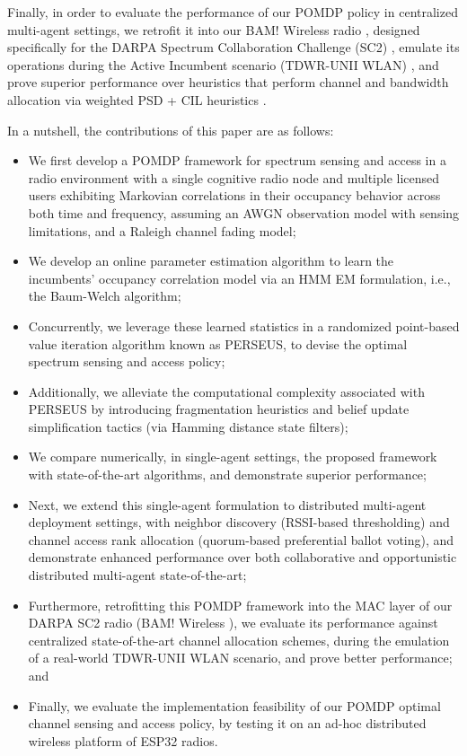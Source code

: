 \documentclass[12pt, draftcls, onecolumn]{IEEEtran}
\begin{document}
Finally, in order to evaluate the performance of our POMDP policy in centralized multi-agent settings, we retrofit it into our BAM! Wireless radio \cite{BAM}, designed specifically for the DARPA Spectrum Collaboration Challenge (SC2) \cite{DARPA:SC2, DARPA:SC2scenarios}, emulate its operations during the Active Incumbent scenario (TDWR-UNII WLAN) \cite{DARPA:ActiveIncumbent}, and prove superior performance over heuristics that perform channel and bandwidth allocation via weighted PSD + CIL heuristics \cite{DARPA:CIL, DARPASC2:end1, DARPASC2:end2, DARPASC2:end3, DARPASC2:end4}.

 In a nutshell, the contributions of this paper are as follows:
\begin{itemize}
    \item We first develop a POMDP framework for spectrum sensing and access in a radio environment with a single cognitive radio node and multiple licensed users exhibiting Markovian correlations in their occupancy behavior across both time and frequency, assuming an AWGN observation model with sensing limitations, and a Raleigh channel fading model;
    \item We develop an online parameter estimation algorithm to learn the incumbents' occupancy correlation model via an HMM EM formulation, i.e., the Baum-Welch algorithm;
    \item Concurrently, we leverage these learned statistics in a randomized point-based value iteration algorithm known as PERSEUS, to devise the optimal spectrum sensing and access policy;
    \item Additionally, we alleviate the computational complexity associated with PERSEUS by introducing fragmentation heuristics and belief update simplification tactics (via Hamming distance state filters);
    \item We compare numerically, in single-agent settings, the proposed framework with state-of-the-art algorithms, and demonstrate superior performance;
    \item Next, we extend this single-agent formulation to distributed multi-agent deployment settings, with neighbor discovery (RSSI-based thresholding) and channel access rank allocation (quorum-based preferential ballot voting), and demonstrate enhanced performance over both collaborative and opportunistic distributed multi-agent state-of-the-art;
    \item Furthermore, retrofitting this POMDP framework into the MAC layer of our DARPA SC2 radio (BAM! Wireless \cite{BAM}), we evaluate its performance against centralized state-of-the-art channel allocation schemes, during the emulation of a real-world TDWR-UNII WLAN scenario, and prove better performance; and
    \item Finally, we evaluate the implementation feasibility of our POMDP optimal channel sensing and access policy, by testing it on an ad-hoc distributed wireless platform of ESP32 radios.
\end{itemize}
\end{document}
